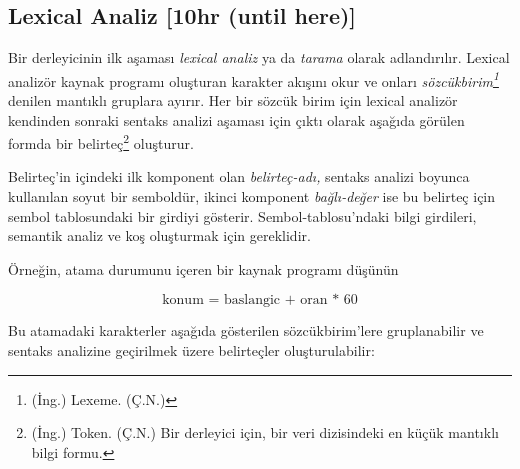 \subsection{Lexical Analiz [10hr (until here)]}

\setcounter{footnote}{0}

Bir derleyicinin ilk aşaması \textit{lexical analiz} ya da \textit{tarama} olarak adlandırılır. Lexical analizör kaynak programı oluşturan karakter akışını okur ve onları \textit{sözcükbirim\footnote{(İng.) Lexeme. (Ç.N.)}} denilen mantıklı gruplara ayırır. Her bir sözcük birim için lexical analizör kendinden sonraki sentaks analizi aşaması için çıktı olarak aşağıda görülen formda bir belirteç\footnote{(İng.) Token. (Ç.N.) Bir derleyici için, bir veri dizisindeki en küçük mantıklı bilgi formu.} oluşturur.

{}


Belirteç'in içindeki ilk komponent olan \textit{belirteç-adı,} sentaks analizi boyunca kullanılan soyut bir semboldür, ikinci komponent \textit{bağlı-değer} ise bu belirteç için sembol tablosundaki bir girdiyi gösterir. Sembol-tablosu'ndaki bilgi girdileri, semantik analiz ve koş oluşturmak için gereklidir.

Örneğin, atama durumunu içeren bir kaynak programı düşünün

\begin{equation}
 		\text{konum = baslangic + oran * 60}
\end{equation}

Bu atamadaki karakterler aşağıda gösterilen sözcükbirim'lere gruplanabilir ve sentaks analizine geçirilmek üzere belirteçler oluşturulabilir:

